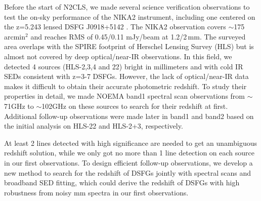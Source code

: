 \documentclass{webofc}
\begin{document}


Before the start of N2CLS, we made several science verification observations to test the on-sky performance of the NIKA2 instrument, including one centered on the z=5.243 lensed DSFG J0918+5142 \cite{Combes12}. The NIKA2 observation covers $\sim$175 arcmin$^2$ and reaches RMS of 0.45/0.11 mJy/beam at 1.2/2\,mm. The surveyed area overlaps with the SPIRE footprint of Herschel Lensing Survey (HLS) \cite{Egami10} but is almost not covered by deep optical/near-IR observations. In this field, we detected 4 sources (HLS-2,3,4 and 22) bright in millimeters and with cold IR SEDs consistent with z=3-7 DSFGs. However, the lack of optical/near-IR data makes it difficult to obtain their accurate photometric redshift. To study their properties in detail, we made NOEMA band1 spectral scan observations from $\sim$71GHz to $\sim$102GHz on these sources to search for their redshift at first. Additional follow-up observations were made later in band1 and band2 based on the initial analysis on HLS-22 and HLS-2+3, respectively. 

At least 2 lines detected with high significance are needed to get an unambiguous redshift solution, while we only got no more than 1 line detection on each source in our first observations. To design efficient follow-up observations, we develop a new method to search for the redshift of DSFGs jointly with spectral scans and broadband SED fitting, which could derive the redshift of DSFGs with high robustness from noisy mm spectra in our first observations. 
\end{document}
